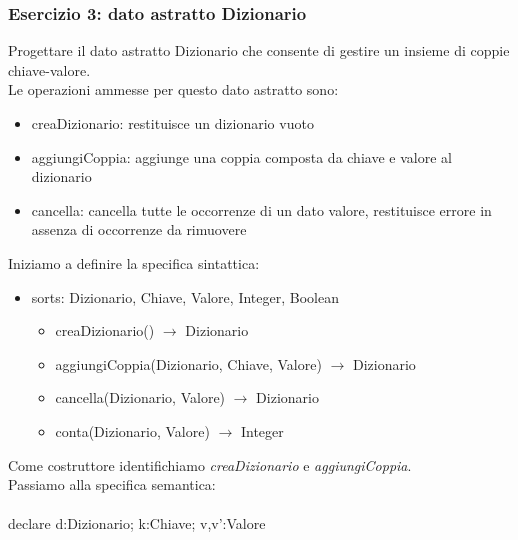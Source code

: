 \documentclass{article}
\begin{document}
	\subsubsection*{Esercizio 3: dato astratto Dizionario}
	Progettare il dato astratto Dizionario che consente di gestire un insieme di coppie chiave-valore.\\
	Le operazioni ammesse per questo dato astratto sono:
	\begin{itemize}
		\item creaDizionario: restituisce un dizionario vuoto
		\item aggiungiCoppia: aggiunge una coppia composta da chiave e valore al dizionario
		\item cancella: cancella tutte le occorrenze di un dato valore, restituisce errore in assenza di occorrenze da rimuovere
	\end{itemize}
	Iniziamo a definire la specifica sintattica:
	\begin{itemize}
		\item sorts: Dizionario, Chiave, Valore, Integer, Boolean
		\begin{itemize}
			\item creaDizionario() $\rightarrow$ Dizionario
			\item aggiungiCoppia(Dizionario, Chiave, Valore) $\rightarrow$ Dizionario
			\item cancella(Dizionario, Valore) $\rightarrow$ Dizionario
			\\
			\item conta(Dizionario, Valore) $\rightarrow$ Integer
		\end{itemize}
	\end{itemize}
	Come costruttore identifichiamo \textit{creaDizionario} e \textit{aggiungiCoppia}. \\
	Passiamo alla specifica semantica: \\\\
	declare d:Dizionario; k:Chiave; v,v':Valore 
\end{document}
